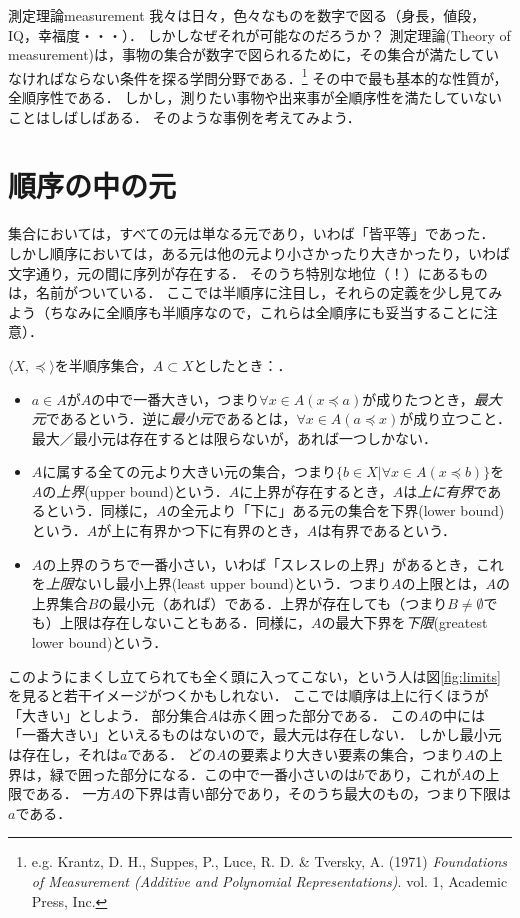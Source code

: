 \documentclass[dvipdfmx,11pt,a4paper]{jsarticle}
\begin{document}
\begin{rei}{測定理論}{measurement}
我々は日々，色々なものを数字で図る（身長，値段，IQ，幸福度・・・）．
しかしなぜそれが可能なのだろうか？
測定理論(Theory of measurement)は，事物の集合が数字で図られるために，その集合が満たしていなければならない条件を探る学問分野である．\footnote{e.g. Krantz, D. H., Suppes, P., Luce, R. D. \& Tversky, A. (1971) \textit{Foundations of Measurement (Additive and Polynomial Representations)}. vol. 1, Academic Press, Inc.}
その中で最も基本的な性質が，全順序性である．
しかし，測りたい事物や出来事が全順序性を満たしていないことはしばしばある．
そのような事例を考えてみよう．
\end{rei}


\section{順序の中の元}
集合においては，すべての元は単なる元であり，いわば「皆平等」であった．
しかし順序においては，ある元は他の元より小さかったり大きかったり，いわば文字通り，元の間に序列が存在する．
そのうち特別な地位（！）にあるものは，名前がついている．
ここでは半順序に注目し，それらの定義を少し見てみよう（ちなみに全順序も半順序なので，これらは全順序にも妥当することに注意）．

$\langle X, \preceq \rangle$を半順序集合，$A \subset X$としたとき：．
\begin{itemize}
  \item $a \in A$が$A$の中で一番大きい，つまり$\forall x \in A (x \preceq a)$が成りたつとき，\emph{最大元}であるという．逆に\emph{最小元}であるとは，$\forall x \in A (a \preceq x)$が成り立つこと．最大／最小元は存在するとは限らないが，あれば一つしかない．
  \item $A$に属する全ての元より大きい元の集合，つまり$\{ b \in X | \forall x \in A (x \preceq b) \}$を$A$の\emph{上界}(upper bound)という．$A$に上界が存在するとき，$A$は\emph{上に有界}であるという．同様に，$A$の全元より「下に」ある元の集合を下界(lower bound)という．$A$が上に有界かつ下に有界のとき，$A$は有界であるという．
  \item $A$の上界のうちで一番小さい，いわば「スレスレの上界」があるとき，これを\emph{上限}ないし最小上界(least upper bound)という．つまり$A$の上限とは，$A$の上界集合$B$の最小元（あれば）である．上界が存在しても（つまり$B \neq \emptyset$でも）上限は存在しないこともある．同様に，$A$の最大下界を\emph{下限}(greatest lower bound)という．
\end{itemize}


  このようにまくし立てられても全く頭に入ってこない，という人は図\ref{fig:limits}を見ると若干イメージがつくかもしれない．
ここでは順序は上に行くほうが「大きい」としよう．
部分集合$A$は赤く囲った部分である．
この$A$の中には「一番大きい」といえるものはないので，最大元は存在しない．
しかし最小元は存在し，それは$a$である．
どの$A$の要素より大きい要素の集合，つまり$A$の上界は，緑で囲った部分になる．この中で一番小さいのは$b$であり，これが$A$の上限である．
一方$A$の下界は青い部分であり，そのうち最大のもの，つまり下限は$a$である．
\end{document}
